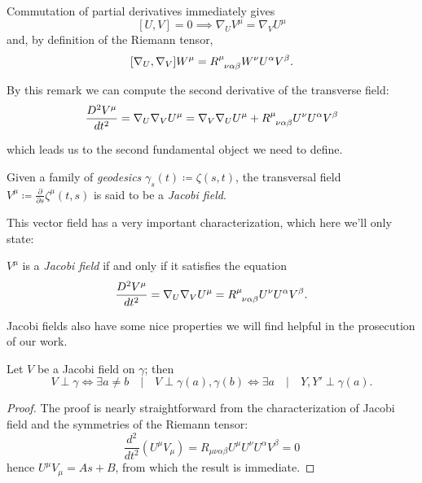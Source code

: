 

\begin{remark}
	Commutation of partial derivatives immediately gives 
	\[
	[U, V] = 0 \implies \nabla_U V^{\mu} = \nabla_V U^{\mu}
	\]
	and, by definition of the Riemann tensor,
	\[
	[\nabla_U, \nabla_V]W^{\mu} = R\indices{^{\mu}_{\nu\alpha\beta}}W^{\nu}U^{\alpha}V^{\beta}.
	\]
\end{remark}

By this remark we can compute the second derivative of the transverse field:
\[
\frac{D^2\tensor{V}{^\mu} }{dt^2} = \nabla_U\nabla_V U^{\mu} = \nabla_V\nabla_U U^{\mu} + R\indices{^{\mu}_{\nu\alpha\beta}}U^{\nu}U^{\alpha}V^{\beta}
\]

which leads us to the second fundamental object we need to define. 
\begin{definition}
	Given a family of \emph{geodesics} \(\gamma_s(t) \coloneqq \zeta(s,t)\), the transversal field \(V^{\mu} \coloneqq \frac{\partial}{\partial s} \zeta^{\mu}(t,s)\) is said to be a \emph{Jacobi field}.
\end{definition}

This vector field has a very important characterization, which here we'll only state:
\begin{lemma}
\(V^{\mu}\) is a \emph{Jacobi field} if and only if it satisfies the equation
	\begin{equation}
	\label{eq:Jacobi}
		\frac{D^2\tensor{V}{^\mu} }{dt^2} = \nabla_U\nabla_V U^{\mu} =  R\indices{^{\mu}_{\nu\alpha\beta}}U^{\nu}U^{\alpha}V^{\beta}.
	\end{equation}
\end{lemma}

Jacobi fields also have some nice properties we will find helpful in the prosecution of our work.
\begin{lemma}
	\label{lemma:Jacobi-fields-properties}
	Let \(V\) be a Jacobi field on \(\gamma\); then
	\[
	V \perp \gamma \iff \exists a\neq b \quad\vert\quad V\perp \gamma(a),\gamma(b) \iff \exists a \quad\vert\quad Y, Y' \perp \gamma(a).
	\]
\end{lemma}
\begin{proof}
	The proof is nearly straightforward from the characterization of Jacobi field and the symmetries of the Riemann tensor:
	\[
	\frac{d^2}{dt^2} (U^{\mu}V_{\mu}) = R_{\mu\nu\alpha\beta}U^{\mu}U^{\nu}U^{\alpha}V^{\beta} = 0
	\]
	hence \(U^{\mu}V_{\mu} = As + B\), from which the result is immediate.
\end{proof}

